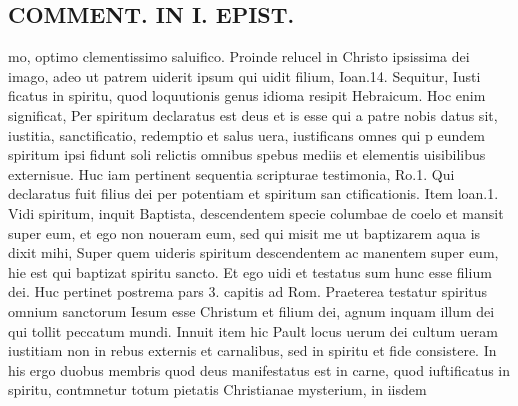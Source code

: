 \documentclass{article}
\begin{document}
\begin{pages}
\section*{COMMENT. IN I. EPIST. }\pstart mo, optimo clementissimo saluifico. Proinde relucel in Christo ipsissima dei imago, adeo ut patrem uiderit ipsum qui uidit filium, Ioan.14. Sequitur, Iusti ficatus in spiritu, quod loquutionis genus idioma resipit Hebraicum. Hoc enim significat, Per spiritum declaratus est deus et is esse qui a patre nobis datus sit, iustitia, sanctificatio, redemptio et salus uera, iustificans omnes qui p eundem spiritum ipsi fidunt soli relictis omnibus spebus mediis et elementis uisibilibus externisue. Huc iam pertinent sequentia scripturae testimonia, Ro.1. Qui declaratus fuit filius dei per potentiam et spiritum san ctificationis. Item loan.1. Vidi spiritum, inquit Baptista, descendentem specie columbae de coelo et mansit super eum, et ego non noueram eum, sed qui misit me ut baptizarem aqua is dixit mihi, Super quem uideris spiritum descendentem ac manentem super eum, hie est qui baptizat spiritu sancto. Et ego uidi et testatus sum hunc esse filium dei. Huc pertinet postrema pars 3. capitis ad Rom. Praeterea testatur spiritus omnium sanctorum Iesum esse Christum et filium dei, agnum inquam illum dei qui tollit peccatum mundi. Innuit item hic Pault locus uerum dei cultum ueram iustitiam non in rebus externis et carnalibus, sed in spiritu et fide consistere. In his ergo duobus membris quod deus manifestatus est in carne, quod iuftificatus in spiritu, contmnetur totum pietatis Christianae mysterium, in iisdem  \pend

\end{pages}
\end{document}
